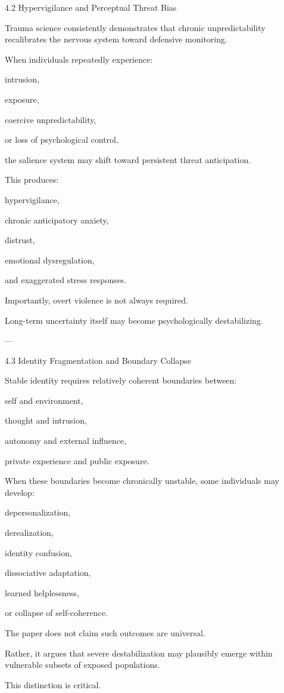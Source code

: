 4.2 Hypervigilance and Perceptual Threat Bias

Trauma science consistently demonstrates that chronic unpredictability recalibrates the nervous system toward defensive monitoring.

When individuals repeatedly experience:

intrusion,

exposure,

coercive unpredictability,

or loss of psychological control,


the salience system may shift toward persistent threat anticipation.

This produces:

hypervigilance,

chronic anticipatory anxiety,

distrust,

emotional dysregulation,

and exaggerated stress responses.


Importantly, overt violence is not always required.

Long-term uncertainty itself may become psychologically destabilizing.


---

4.3 Identity Fragmentation and Boundary Collapse

Stable identity requires relatively coherent boundaries between:

self and environment,

thought and intrusion,

autonomy and external influence,

private experience and public exposure.


When these boundaries become chronically unstable, some individuals may develop:

depersonalization,

derealization,

identity confusion,

dissociative adaptation,

learned helplessness,

or collapse of self-coherence.


The paper does not claim such outcomes are universal.

Rather, it argues that severe destabilization may plausibly emerge within vulnerable subsets of exposed populations.

This distinction is critical.


